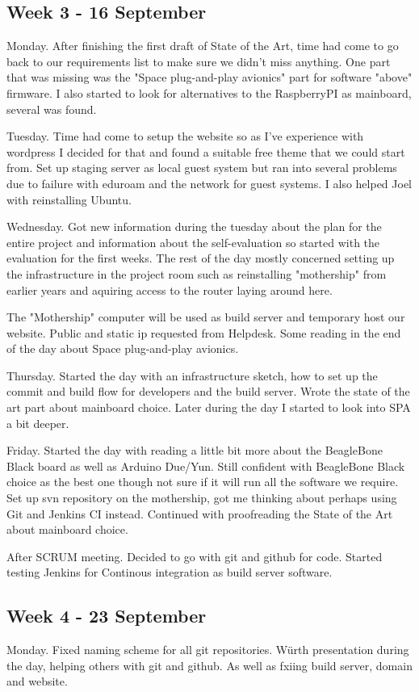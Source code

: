 \subsection{Week 3 - 16 September}\label{week_3}
Monday. After finishing the first draft of State of the Art, time
had come to go back to our requirements list to make sure we didn't miss
anything. One part that was missing was the "Space plug-and-play avionics"
part for software "above" firmware. I also started to look for alternatives
to the RaspberryPI as mainboard, several was found.

Tuesday. Time had come to setup the website so as I've experience with
wordpress I decided for that and found a suitable free theme that we could
start from. Set up staging server as local guest system but ran into several
problems due to failure with eduroam and the network for guest systems. I also
helped Joel with reinstalling Ubuntu.

Wednesday. Got new information during the tuesday about the plan for the entire
project and information about the self-evaluation so started with the
evaluation for the first weeks. The rest of the day mostly concerned setting
up the infrastructure in the project room such as reinstalling "mothership"
from earlier years and aquiring access to the router laying around here.

The "Mothership" computer will be used as build server and temporary host
our website. Public and static ip requested from Helpdesk. Some reading
in the end of the day about Space plug-and-play avionics.

Thursday. Started the day with an infrastructure sketch, how to set up the
commit and build flow for developers and the build server. Wrote the
state of the art part about mainboard choice. Later during the day I started
to look into SPA a bit deeper.

Friday. Started the day with reading a little bit more about the BeagleBone
Black board as well as Arduino Due/Yun. Still confident with BeagleBone Black
choice as the best one though not sure if it will run all the software we
require. Set up svn repository on the mothership, got me thinking about
perhaps using Git and Jenkins CI instead. Continued with proofreading
the State of the Art about mainboard choice.

After SCRUM meeting. Decided to go with git and github for code. Started
testing Jenkins for Continous integration as build server software.

\subsection{Week 4 - 23 September}\label{week_4}
Monday. Fixed naming scheme for all git repositories. Würth presentation during
the day, helping others with git and github. As well as fxiing build server,
domain and website.

